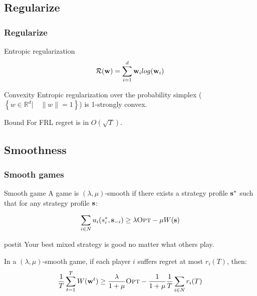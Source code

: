 \documentclass{beamer}
\renewcommand{\vec}[1]{\ensuremath{{\bf #1}}}
\newcommand{\strat}{\ensuremath{s}}
\newcommand{\mst}{\ensuremath{w}}
\newcommand{\opt}{\text{\textsc{Opt}} }
\newcommand{\mR}{\ensuremath{\mathcal{R}}}
\newcommand{\R}{\ensuremath{\mathbb R}}
\begin{document}
\subsection{Regularize}
\begin{frame}
	\frametitle{Regularize}
	\begin{block}{Entropic regularization}
		\begin{equation*}
		\mR(\vec{\mst}) = \sum_{i=1}^{d} \vec{\mst}_i log(\vec{\mst}_i)
		\end{equation*}
	\end{block}
	\pause
	\begin{block}{Convexity }
		Entropic regularization over the probability simplex ($ \left\lbrace \mst \in \R^d | \quad \| \mst\| = 1 \right\rbrace $) is 1-strongly convex.
	\end{block}
	\pause
	\begin{block}{Bound}
		For FRL regret is in $O(\sqrt{T})$.
	\end{block}
\end{frame}


\subsection{Smoothness}
\begin{frame}
	\frametitle{Smooth games}
	\begin{block}{Smooth game}
		A game is
		$(\lambda,\mu)$-smooth if there exists a strategy profile
		$\vec{\strat}^*$ such that for any strategy profile $\vec{\strat}$:
		
		\begin{equation*}
		\sum_{i\in N} u_i(\strat_i^*,\vec{\strat}_{-i}) \geq \lambda \opt - \mu
		W(\vec{\strat})
		\end{equation*}
	\end{block}
		\begin{beamercolorbox}[sep=1em]{postit}
			Your best mixed strategy is good no matter what others play.
		\end{beamercolorbox}
	\pause
	\begin{block}{}
		In a $(\lambda,\mu)$-smooth game, if each player $i$ suffers regret at
		most $r_i(T)$, then:
		\begin{equation*}
		\frac{1}{T} \sum_{t=1}^{T}
		W(\vec{\mst}^t) \geq \frac{\lambda}{1+\mu} \opt
		- \frac{1}{1+\mu}\frac{1}{T}\sum_{i\in N} r_i(T)
		\end{equation*}
	\end{block}
\end{frame}
\end{document}
